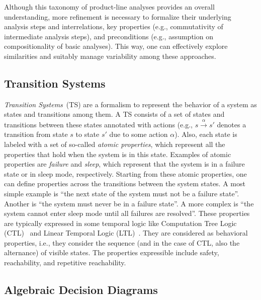 Although this taxonomy of product-line analyses provides an overall
understanding, more refinement is necessary to formalize their underlying
analysis steps and interrelations, key properties (e.g., commutativity of intermediate analysis steps), and preconditions (e.g., assumption on compositionality of basic analyses).
This way, one can effectively explore similarities and suitably manage variability among these approaches.

\subsection{Transition Systems}
\label{sec:transition-systems}

\emph{Transition Systems}~(TS) are a formalism to represent the behavior of a
system as states and transitions among them. 
A TS consists of a set of states and transitions between these states annotated with actions (e.g., $s \xrightarrow{\alpha} s'$ denotes a transition from state $s$ to state $s'$ due to some action $\alpha$). Also, each state is labeled with a set of so-called \emph{atomic properties}, which represent all the properties that hold when the system is in this state. Examples of atomic properties are \textit{failure} and \textit{sleep}, which represent that the system is in a failure state or in sleep mode, respectively. Starting from these atomic properties, one can define properties across the transitions between the system states. A most simple example is ``the next state of the system must not be a failure state''. Another is ``the system must never be in a failure state''. A more complex is ``the system cannot enter sleep mode until all failures are resolved''. These properties are typically expressed in some temporal logic like Computation Tree Logic (CTL)~\cite{Clarke1981} and Linear Temporal Logic (LTL)~\cite{Pnueli1977}. They are considered as behavioral properties, i.e., they consider the sequence (and in the case of CTL, also the alternance) of visible states. The properties expressible include safety, reachability, and repetitive reachability.

\subsection{Algebraic Decision Diagrams}
\label{sec:ADD}


